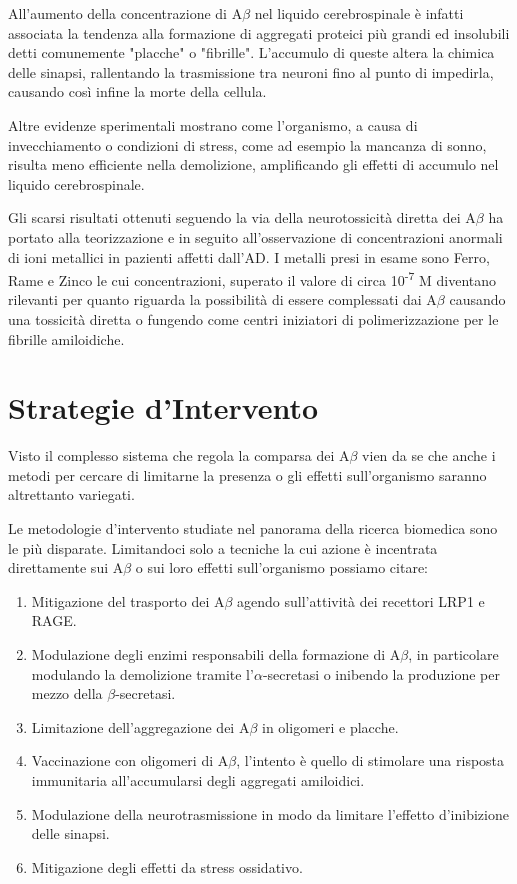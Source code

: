 \documentclass[a4paper, 12pt]{article}
\begin{document}
All'aumento della concentrazione di A$\beta$ nel liquido cerebrospinale è infatti associata la tendenza alla formazione di aggregati proteici più grandi ed insolubili detti comunemente "placche" o "fibrille".
L'accumulo di queste altera la chimica delle sinapsi, rallentando la trasmissione tra neuroni fino al punto di impedirla, causando così infine la morte della cellula.

Altre evidenze sperimentali mostrano come l’organismo, a causa di invecchiamento o condizioni di stress, come ad esempio la mancanza di sonno, risulta meno efficiente nella demolizione, amplificando gli effetti di accumulo nel liquido cerebrospinale.

Gli scarsi risultati ottenuti seguendo la via della neurotossicità diretta dei A$\beta$ ha portato alla teorizzazione e in seguito all’osservazione di concentrazioni anormali di ioni metallici in pazienti affetti dall'AD. I metalli presi in esame sono Ferro, Rame e Zinco le cui concentrazioni, superato il valore di circa 10\textsuperscript{-7}  M diventano rilevanti per quanto riguarda la possibilità di essere complessati dai A$\beta$ causando una tossicità diretta o fungendo come centri iniziatori di polimerizzazione per le fibrille amiloidiche.\cite{kepp_bioinorganic_2012}

\section{Strategie d'Intervento}
Visto il complesso sistema che regola la comparsa dei A$\beta$ vien da se che anche i metodi per cercare di limitarne la presenza o gli effetti sull'organismo saranno altrettanto variegati.

Le metodologie d'intervento studiate nel panorama della ricerca biomedica sono le più disparate. Limitandoci solo a tecniche la cui azione è incentrata direttamente sui A$\beta$ o sui loro effetti sull'organismo possiamo citare:\cite{kumar_review_2015}
\begin{enumerate}
	\item Mitigazione del trasporto dei A$\beta$ agendo sull'attività dei recettori LRP1 e RAGE.
	\item Modulazione degli enzimi responsabili della formazione di A$\beta$, in particolare modulando la demolizione tramite l'$\alpha$-secretasi o inibendo la produzione per mezzo della $\beta$-secretasi.
	\item Limitazione dell'aggregazione dei A$\beta$ in oligomeri e placche.
	\item Vaccinazione con oligomeri di A$\beta$, l'intento è quello di stimolare una risposta immunitaria all'accumularsi degli aggregati amiloidici.
	\item Modulazione della neurotrasmissione in modo da limitare l'effetto d'inibizione delle sinapsi.
	\item Mitigazione degli effetti da stress ossidativo.
\end{enumerate}
\end{document}
